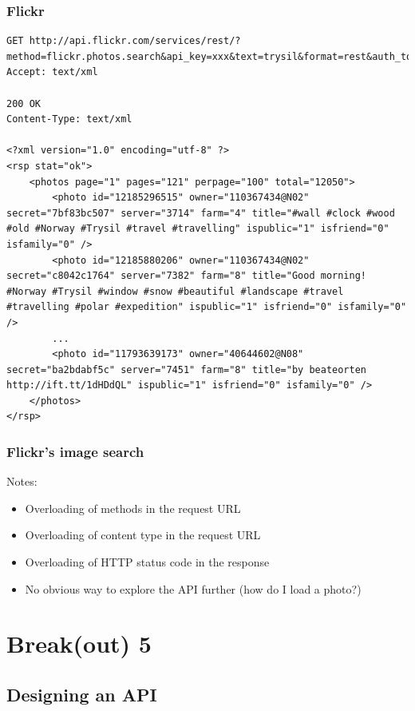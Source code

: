 \documentclass[8pt]{article}
\begin{document}
\subsubsection{Flickr}
\label{sec:org27ee766}
\begin{verbatim}
GET http://api.flickr.com/services/rest/?method=flickr.photos.search&api_key=xxx&text=trysil&format=rest&auth_token=xxx&api_sig=xxx
Accept: text/xml

200 OK
Content-Type: text/xml

<?xml version="1.0" encoding="utf-8" ?>
<rsp stat="ok">
    <photos page="1" pages="121" perpage="100" total="12050">
        <photo id="12185296515" owner="110367434@N02" secret="7bf83bc507" server="3714" farm="4" title="#wall #clock #wood #old #Norway #Trysil #travel #travelling" ispublic="1" isfriend="0" isfamily="0" />
        <photo id="12185880206" owner="110367434@N02" secret="c8042c1764" server="7382" farm="8" title="Good morning!   #Norway #Trysil #window #snow #beautiful #landscape #travel #travelling #polar #expedition" ispublic="1" isfriend="0" isfamily="0" />
        ...
        <photo id="11793639173" owner="40644602@N08" secret="ba2bdabf5c" server="7451" farm="8" title="by beateorten http://ift.tt/1dHDdQL" ispublic="1" isfriend="0" isfamily="0" />
    </photos>
</rsp>
\end{verbatim}
\subsubsection{Flickr's image search}
\label{sec:orgc90bce0}
Notes:

\begin{itemize}
\item Overloading of methods in the request URL
\item Overloading of content type in the request URL
\item Overloading of HTTP status code in the response
\item No obvious way to explore the API further (how do I load a photo?)
\end{itemize}

\section{Break(out) 5}
\label{sec:org41d1f5f}
\subsection{Designing an API}
\label{sec:org3ec8553}
\end{document}
